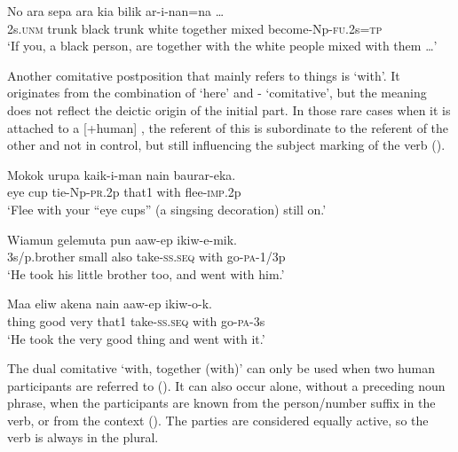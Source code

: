 \ea%
\label{ex:x1819}
\gll No ara sepa ara kia  bilik ar-i-nan=na {\dots}\\
2s.\textsc{unm} trunk black trunk white together mixed become-Np-\textsc{fu}.2s=\textsc{tp}\\
\glt`If you, a black person, are together with the white people mixed with them {\dots}'
\z

Another comitative postposition that mainly refers to things is  `with'. It originates from the combination of  `here' and - `comitative', but the meaning does not reflect the deictic origin of the initial part. In those rare cases when it is attached to a [+human] , the referent of this  is subordinate to the referent of the other  and not in control, but still influencing the subject marking of the verb (). 

\ea%
\label{ex:x824}
\gll Mokok urupa kaik-i-man nain  baurar-eka. \\
eye cup tie-Np-\textsc{pr}.2p that1 with flee-\textsc{imp}.2p\\
\glt`Flee with your ``eye cups'' (a singsing decoration) still on.'
\z

\ea%
\label{ex:x825}
\gll Wiamun gelemuta pun aaw-ep  ikiw-e-mik. \\
3s/p.brother small also take-\textsc{ss}.\textsc{seq} with go-\textsc{pa}-1/3p\\
\glt`He took his little brother too, and went with him.'
\z

\ea%
\label{ex:x1818}
\gll Maa eliw akena nain aaw-ep  ikiw-o-k. \\
thing good very that1 take-\textsc{ss}.\textsc{seq} with go-\textsc{pa}-3s\\
\glt`He took the very good thing and went with it.'
\z

The dual comitative  `with, together (with)' can only be used when two human participants are referred to (). It can also occur alone, without a preceding noun phrase, when the participants are known from the person/number suffix in the verb, or from the context (). The parties are considered equally active, so the verb is always in the plural.

